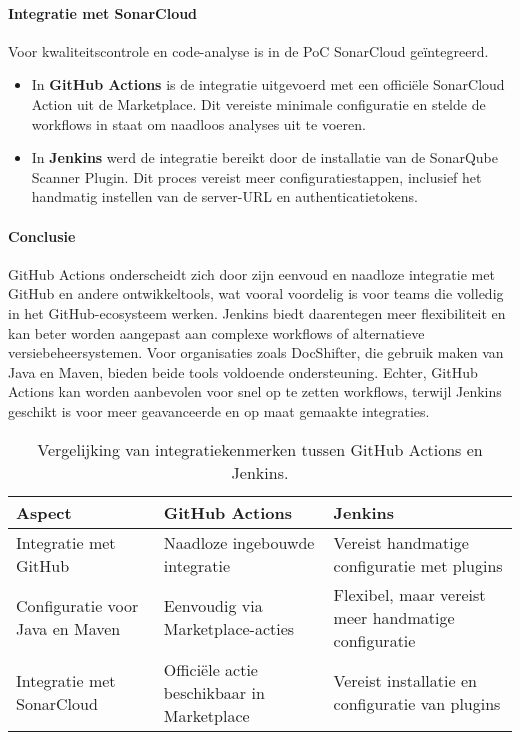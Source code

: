 \paragraph{Integratie met SonarCloud}
Voor kwaliteitscontrole en code-analyse is in de PoC SonarCloud geïntegreerd. 
\begin{itemize}
    \item In \textbf{GitHub Actions} is de integratie uitgevoerd met een officiële SonarCloud Action uit de Marketplace. Dit vereiste minimale configuratie en stelde de workflows in staat om naadloos analyses uit te voeren.
    \item In \textbf{Jenkins} werd de integratie bereikt door de installatie van de SonarQube Scanner Plugin. Dit proces vereist meer configuratiestappen, inclusief het handmatig instellen van de server-URL en authenticatietokens.
\end{itemize}

\paragraph{Conclusie}
GitHub Actions onderscheidt zich door zijn eenvoud en naadloze integratie met GitHub en andere ontwikkeltools, wat vooral voordelig is voor teams die volledig in het GitHub-ecosysteem werken. Jenkins biedt daarentegen meer flexibiliteit en kan beter worden aangepast aan complexe workflows of alternatieve versiebeheersystemen. Voor organisaties zoals DocShifter, die gebruik maken van Java en Maven, bieden beide tools voldoende ondersteuning. Echter, GitHub Actions kan worden aanbevolen voor snel op te zetten workflows, terwijl Jenkins geschikt is voor meer geavanceerde en op maat gemaakte integraties.

\begin{table}[h!]
    \centering
    \begin{tabular}{|p{5cm}|p{5cm}|p{5cm}|}
        \hline
        \textbf{Aspect} & \textbf{GitHub Actions} & \textbf{Jenkins} \\ \hline
        Integratie met GitHub & Naadloze ingebouwde integratie & Vereist handmatige configuratie met plugins \\ \hline
        Configuratie voor Java en Maven & Eenvoudig via Marketplace-acties & Flexibel, maar vereist meer handmatige configuratie \\ \hline
        Integratie met SonarCloud & Officiële actie beschikbaar in Marketplace & Vereist installatie en configuratie van plugins \\ \hline
    \end{tabular}
    \caption{Vergelijking van integratiekenmerken tussen GitHub Actions en Jenkins.}
    \label{tab:integration_comparison}
\end{table}


